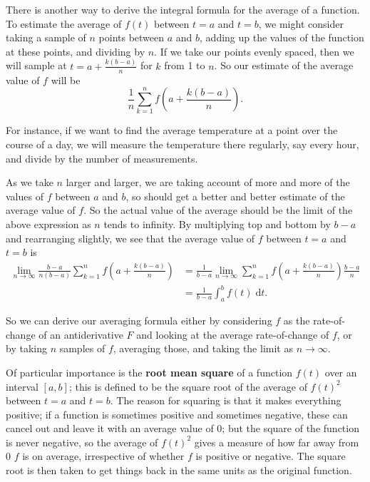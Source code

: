 \documentclass{article}
\newcommand{\diff}{\;\mathrm{d}}
\begin{document}
There is another way to derive the integral formula for the average of a function. To estimate the average of $f(t)$ between $t=a$ and $t=b$, we might consider taking a sample of $n$ points between $a$ and $b$, adding up the values of the function at these points, and dividing by $n$. If we take our points evenly spaced, then we will sample at $t=a+\frac{k(b-a)}{n}$ for $k$ from 1 to $n$. So our estimate of the average value of $f$ will be
\[\frac{1}{n}\sum_{k=1}^n f\left(a+\frac{k(b-a)}{n}\right).\]

For instance, if we want to find the average temperature at a point over the course of a day, we will measure the temperature there regularly, say every hour, and divide by the number of measurements.

As we take $n$ larger and larger, we are taking account of more and more of the values of $f$ between $a$ and $b$, so should get a better and better estimate of the average value of $f$. So the actual value of the average should be the limit of the above expression as $n$ tends to infinity. By multiplying top and bottom by $b-a$ and rearranging slightly, we see that the average value of $f$ between $t=a$ and $t=b$ is
\begin{align*}
	\lim_{n\to\infty}\frac{b-a}{n(b-a)}\sum_{k=1}^n f\left(a+\frac{k(b-a)}{n}\right) &= \frac{1}{b-a}\lim_{n\to\infty}\sum_{k=1}^n f\left(a+\frac{k(b-a)}{n}\right)\frac{b-a}{n}\\
	&=\frac{1}{b-a}\int_a^b f(t)\diff t.
\end{align*}

So we can derive our averaging formula either by considering $f$ as the rate-of-change of an antiderivative $F$ and looking at the average rate-of-change of $f$, or by taking $n$ samples of $f$, averaging those, and taking the limit as $n\to\infty$.\medskip



Of particular importance is the \textbf{root mean square} of a function $f(t)$ over an interval $[a,b]$; this is defined to be the square root of the average of $f(t)^2$ between $t=a$ and $t=b$. The reason for squaring is that it makes everything positive; if a function is sometimes positive and sometimes negative, these can cancel out and leave it with an average value of 0; but the square of the function is never negative, so the average of $f(t)^2$ gives a measure of how far away from 0 $f$ is on average, irrespective of whether $f$ is positive or negative. The square root is then taken to get things back in the same units as the original function.
\end{document}
